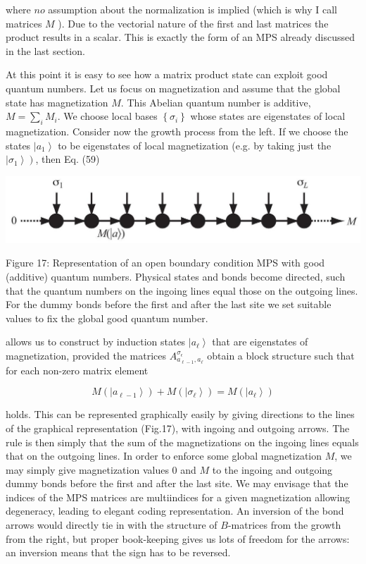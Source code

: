 \documentclass[12pt]{article}
\begin{document}
where $n o$ assumption about the normalization is implied (which is why I call matrices $M$ ). Due to the vectorial nature of the first and last matrices the product results in a scalar. This is exactly the form of an MPS already discussed in the last section.

At this point it is easy to see how a matrix product state can exploit good quantum numbers. Let us focus on magnetization and assume that the global state has magnetization $M$. This Abelian quantum number is additive, $M=\sum_{i} M_{i}$. We choose local bases $\left\{\sigma_{i}\right\}$ whose states are eigenstates of local magnetization. Consider now the growth process from the left. If we choose the states $\left|a_{1}\right\rangle$ to be eigenstates of local magnetization (e.g. by taking just the $\left.\left|\sigma_{1}\right\rangle\right)$, then Eq. (59)

\begin{center}
\includegraphics[max width=\textwidth]{2024_05_04_afc4ad226da9ccfe0ac8g-030}
\end{center}

Figure 17: Representation of an open boundary condition MPS with good (additive) quantum numbers. Physical states and bonds become directed, such that the quantum numbers on the ingoing lines equal those on the outgoing lines. For the dummy bonds before the first and after the last site we set suitable values to fix the global good quantum number.

allows us to construct by induction states $\left|a_{\ell}\right\rangle$ that are eigenstates of magnetization, provided the matrices $A_{a_{\ell-1}, a_{\ell}}^{\sigma_{\epsilon}}$ obtain a block structure such that for each non-zero matrix element


\begin{equation*}
M\left(\left|a_{\ell-1}\right\rangle\right)+M\left(\left|\sigma_{\ell}\right\rangle\right)=M\left(\left|a_{\ell}\right\rangle\right) \tag{76}
\end{equation*}


holds. This can be represented graphically easily by giving directions to the lines of the graphical representation (Fig.17), with ingoing and outgoing arrows. The rule is then simply that the sum of the magnetizations on the ingoing lines equals that on the outgoing lines. In order to enforce some global magnetization $M$, we may simply give magnetization values 0 and $M$ to the ingoing and outgoing dummy bonds before the first and after the last site. We may envisage that the indices of the MPS matrices are multiindices for a given magnetization allowing degeneracy, leading to elegant coding representation. An inversion of the bond arrows would directly tie in with the structure of $B$-matrices from the growth from the right, but proper book-keeping gives us lots of freedom for the arrows: an inversion means that the sign has to be reversed.
\end{document}
